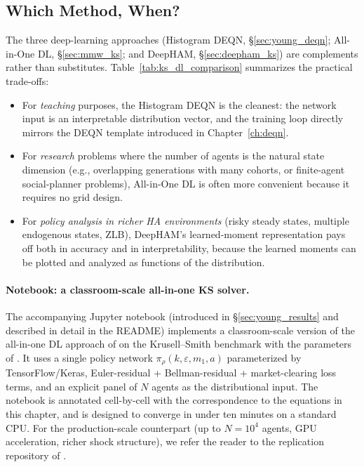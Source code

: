\documentclass[11pt,a4paper]{report}
\begin{document}
\subsection{Which Method, When?}

The three deep-learning approaches (Histogram DEQN, §\ref{sec:young_deqn}; All-in-One DL, §\ref{sec:mmw_ks}; and DeepHAM, §\ref{sec:deepham_ks}) are complements rather than substitutes.  Table~\ref{tab:ks_dl_comparison} summarizes the practical trade-offs:
\begin{itemize}[itemsep=2pt]
\item For \emph{teaching} purposes, the Histogram DEQN is the cleanest: the network input is an interpretable distribution vector, and the training loop directly mirrors the DEQN template introduced in Chapter~\ref{ch:deqn}.
\item For \emph{research} problems where the number of agents is the natural state dimension (e.g., overlapping generations with many cohorts, or finite-agent social-planner problems), All-in-One DL is often more convenient because it requires no grid design.
\item For \emph{policy analysis in richer HA environments} (risky steady states, multiple endogenous states, ZLB), DeepHAM's learned-moment representation pays off both in accuracy and in interpretability, because the learned moments can be plotted and analyzed as functions of the distribution.
\end{itemize}

\paragraph{Notebook: a classroom-scale all-in-one KS solver.}
The accompanying Jupyter notebook  (introduced in §\ref{sec:young_results} and described in detail in the README) implements a classroom-scale version of the all-in-one DL approach of \citet{maliar2021deep} on the Krusell--Smith benchmark with the parameters of \citet{krusell1998income}.  It uses a single policy network $\pi_\rho(k, \varepsilon, m_1, a)$ parameterized by TensorFlow/Keras, Euler-residual + Bellman-residual + market-clearing loss terms, and an explicit panel of $N$ agents as the distributional input.  The notebook is annotated cell-by-cell with the correspondence to the equations in this chapter, and is designed to converge in under ten minutes on a standard CPU.  For the production-scale counterpart (up to $N = 10^4$ agents, GPU acceleration, richer shock structure), we refer the reader to the replication repository of \citet{marcmaliar2022dlks}.
\end{document}
